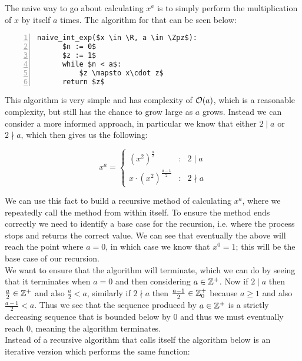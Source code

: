 The naive way to go about calculating \(x^a\) is to simply perform the multiplication of \(x\) by itself \(a\) times. The algorithm for that can be seen below:

\begin{lstlisting}[numbers=left,frame=single,mathescape,caption={Naive integer exponentiation},label={PCD_"Naive int exp"}]
  naive_int_exp($x \in \R, a \in \Zpz$):
      $n := 0$
      $z := 1$
      while $n < a$:
          $z \mapsto x\cdot z$
      return $z$
\end{lstlisting}

This algorithm is very simple and has complexity of \(\mathcal{O}(a)\), which is a reasonable complexity, but still has the chance to grow large as \(a\) grows. Instead we can consider a more informed approach, in particular we know that either \(2 \mid a\) or \(2 \nmid a\), which then gives us the following:

\begin{displaymath}
	x^a = \left\{\begin{array}{lcl}
		(x^2)^{\tfrac{a}{2}} & : & 2 \mid a\\
		x \cdot (x^2)^{\tfrac{a-1}{2}} & : & 2 \nmid a
	\end{array}\right.
\end{displaymath}

We can use this fact to build a recursive method of calculating \(x^a\), where we repeatedly call the method from within itself. To ensure the method ends correctly we need to identify a base case for the recursion, i.e. where the process stops and returns the correct value. We can see that eventually the above will reach the point where \(a = 0\), in which case we know that \(x^0 = 1\); this will be the base case of our recursion.\\

We want to ensure that the algorithm will terminate, which we can do by seeing that it terminates when \(a = 0\) and then considering \(a \in \mathbb{Z}^+\). Now if \(2 \mid a\) then \(\tfrac{a}{2} \in \mathbb{Z}^+\) and also \(\tfrac{a}{2} < a\), similarly if \(2 \nmid a\) then \(\tfrac{a-1}{2} \in \mathbb{Z}^+_0\) because \(a \ge 1\) and also \(\tfrac{a-1}{2} < a\). Thus we see that the sequence produced by \(a \in \mathbb{Z}^+\) is a strictly decreasing sequence that is bounded below by 0 and thus we must eventually reach 0, meaning the algorithm terminates.\\

Instead of a recursive algorithm that calls itself the algorithm below is an iterative version which performs the same function:

